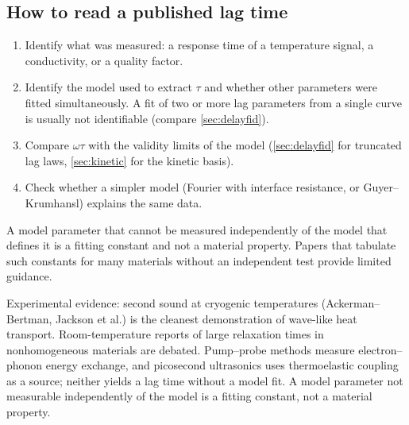 
\subsection{How to read a published lag time}
\begin{enumerate}
\item Identify what was measured: a response time of a temperature signal, a conductivity, or a quality factor.
\item Identify the model used to extract $\tau$ and whether other parameters were fitted simultaneously. A fit of two or more lag parameters from a single curve is usually not identifiable (compare \cref{sec:delayfid}).
\item Compare $\omega\tau$ with the validity limits of the model (\cref{sec:delayfid} for truncated lag laws, \cref{sec:kinetic} for the kinetic basis).
\item Check whether a simpler model (Fourier with interface resistance, or Guyer--Krumhansl) explains the same data.
\end{enumerate}
A model parameter that cannot be measured independently of the model that defines it is a fitting constant and not a material property. Papers that tabulate such constants for many materials without an independent test provide limited guidance.

\begin{summarybox}[Summary]
Experimental evidence: second sound at cryogenic temperatures (Ackerman--Bertman, Jackson et al.) is the cleanest demonstration of wave-like heat transport. Room-temperature reports of large relaxation times in nonhomogeneous materials are debated. Pump--probe methods measure electron--phonon energy exchange, and picosecond ultrasonics uses thermoelastic coupling as a source; neither yields a lag time without a model fit. A model parameter not measurable independently of the model is a fitting constant, not a material property.
\end{summarybox}
